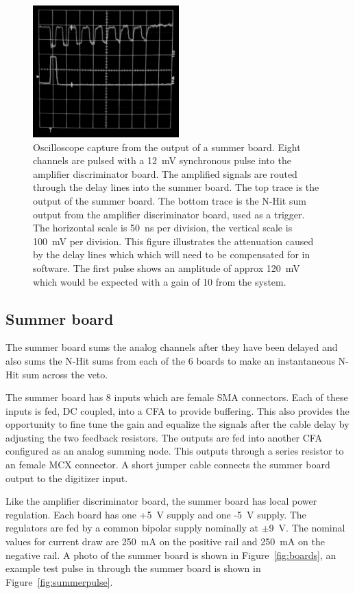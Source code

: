 \documentclass[review,number,sort&compress]{elsarticle}
\begin{document}
\begin{figure}[ht]
\begin{center}
	\includegraphics[height=2in, keepaspectratio=true]{graphics/delaypulse_bw.jpg}
	\caption{Oscilloscope capture from the output of a summer board. Eight channels are
		pulsed with a 12~mV synchronous pulse into the amplifier discriminator board. The amplified
		signals are routed through the delay lines into the summer board. The top trace is
		the output of the summer board. The bottom trace is the N-Hit sum output from the
		amplifier discriminator board, used as a trigger. The horizontal scale is 50~ns per division,
		the vertical scale is 100~mV per division. This figure illustrates the attenuation caused by the delay
		lines which which will need to be compensated for in software. The first pulse shows an amplitude of approx 120~mV which would be expected with a gain of 10 from the system.
\label{fig:multipulse}}
\end{center}
\end{figure}

\subsection{Summer board}
\label{sec:Sum}
%
The summer board sums the analog channels after they have been delayed
and also sums the N-Hit sums from each of the 6 boards to make an
instantaneous N-Hit sum across the veto. 

The summer board has 8 inputs which are female SMA connectors. Each of
these inputs is fed, DC coupled, into a CFA to provide buffering. This
also provides the opportunity to fine tune the gain and equalize the
signals after the cable delay by adjusting the two feedback resistors.
The outputs are fed into another CFA configured as an analog summing
node. This outputs through a series resistor to an female MCX
connector. A short jumper cable connects the summer board output to
the digitizer input.  

Like the amplifier discriminator board, the summer board has local
power regulation.  Each board has one +5~V supply and one -5~V supply.
The regulators are fed by a common bipolar supply nominally at
$\pm$9~V.  The nominal values for current draw are 250~mA on the
positive rail and 250~mA on the negative rail.  A photo of the summer
board is shown in Figure~\ref{fig:boards}, an example test pulse in
through the summer board is shown in Figure~\ref{fig:summerpulse}.
\end{document}
